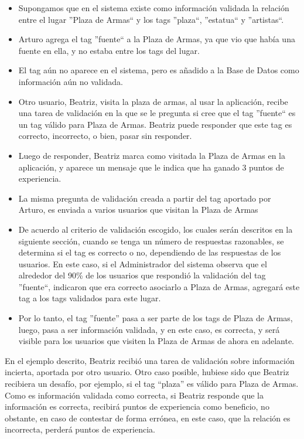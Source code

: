 \documentclass[10pt,letterpaper]{article}
\begin{document}
\begin{itemize}
 \item Supongamos que en el sistema existe como información validada la relación entre el lugar ''Plaza de Armas`` y los tags ''plaza``, ''estatua`` y ''artistas``.
 \item Arturo agrega el tag ''fuente`` a la Plaza de Armas, ya que vio que había una fuente en ella, y no estaba entre los tags del lugar.
 \item El tag aún no aparece en el sistema, pero es añadido a la Base de Datos como información aún no validada.
 \item Otro usuario, Beatriz, visita la plaza de armas, al usar la aplicación, recibe una tarea de validación en la que se le pregunta si cree que el tag ''fuente`` es un tag válido para Plaza de Armas. Beatriz puede responder que este tag es correcto, incorrecto, o bien, pasar sin responder.
 \item Luego de responder, Beatriz marca como visitada la Plaza de Armas en la aplicación, y aparece un mensaje que le indica que ha ganado 3 puntos de experiencia.
 \item La misma pregunta de validación creada a partir del tag aportado por Arturo, es enviada a varios usuarios que visitan la Plaza de Armas
 \item De acuerdo al criterio de validación escogido, los cuales serán descritos en la siguiente sección, cuando se tenga un número de respuestas razonables, se determina si el tag es correcto o no, dependiendo de las respuestas de los usuarios. En este caso, si el Administrador del sistema observa que el alrededor del 90\% de los usuarios que respondió la validación del tag ''fuente``, indicaron que era correcto asociarlo a Plaza de Armas, agregará este tag a los tags validados para este lugar.
 \item Por lo tanto, el tag ''fuente'' pasa a ser parte de los tags de Plaza de Armas, luego, pasa a ser información validada, y en este caso, es correcta, y será visible para los usuarios que visiten la Plaza de Armas de ahora en adelante.

\end{itemize}

En el ejemplo descrito, Beatriz recibió una tarea de validación sobre información incierta, aportada por otro usuario. Otro caso posible, hubiese sido que Beatriz recibiera un desafío, por ejemplo, si el tag ``plaza'' es válido para Plaza de Armas. Como es información validada como correcta, si Beatriz responde que la información es correcta, recibirá puntos de experiencia como beneficio, no obstante, en caso de contestar de forma errónea, en este caso, que la relación es incorrecta, perderá puntos de experiencia.\\
\end{document}
